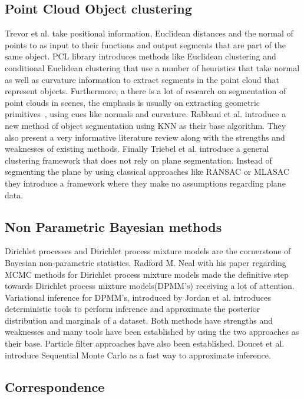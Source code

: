 \documentclass[]{article}
\begin{document}
\subsection{Point Cloud Object clustering}

Trevor et al.\cite{pointSeg} take positional information, Euclidean distances and the normal of points to as input to their functions and output segments that are part of the same object. PCL library\cite{pcl} introduces methods like Euclidean clustering and conditional Euclidean clustering that use a number of heuristics that take normal as well as curvature information to extract segments in the point cloud that represent objects. Furthermore, a there is a lot of research on segmentation of point clouds in scenes, the emphasis is usually on extracting geometric primitives~\cite{planarSeg},\cite{planarSeg2} using cues like normals and curvature. Rabbani et al.\cite{segOverview} introduce a new method of object segmentation using KNN as their base algorithm. They also present a very informative literature review along with the strengths and weaknesses of existing methods. Finally Triebel et al.\cite{smartSeg} introduce a general clustering framework that does not rely on plane segmentation. Instead of segmenting the plane by using classical approaches like RANSAC or MLASAC they introduce a framework where they make no assumptions regarding plane data. 

\subsection{Non Parametric Bayesian methods}

Dirichlet processes and Dirichlet process mixture models are the cornerstone of Bayesian non-parametric statistics. Radford M. Neal\cite{bayes:neal} with his paper regarding MCMC methods for Dirichlet process mixture models made the definitive step towards Dirichlet process mixture models(DPMM's) receiving a lot of attention. Variational inference for DPMM's, introduced by Jordan et al.\cite{bayes:jordan} introduces deterministic tools to perform inference and approximate the posterior distribution and marginals of a dataset. Both methods have strengths and weaknesses and many tools have been established by using the two approaches as their base. Particle filter approaches have also been established. Doucet et al.\cite{bayes:smc} introduce Sequential Monte Carlo as a fast way to approximate inference.
\subsection{Correspondence}
\end{document}

